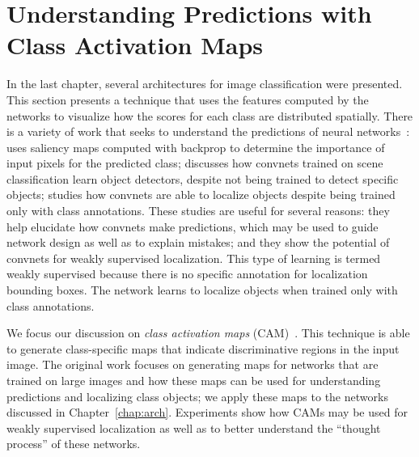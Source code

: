 
\section{Understanding Predictions with Class Activation Maps}
In the last chapter, several architectures for image classification were presented. This section presents a technique that uses the features computed by the networks to visualize how the scores for each class are distributed spatially. There is a variety of work that seeks to understand the predictions of neural networks~\cite{simonyan2014deep,zhou2015object,oquab2015object,zhou2016learning,selvaraju2016gradcam}: \cite{simonyan2014deep} uses saliency maps computed with backprop to determine the importance of input pixels for the predicted class; \cite{zhou2015object} discusses how convnets trained on scene classification learn object detectors, despite not being trained to detect specific objects; \cite{oquab2015object} studies how convnets are able to localize objects despite being trained only with class annotations. These studies are useful for several reasons: they help elucidate how convnets make predictions, which may be used to guide network design as well as to explain mistakes; and they show the potential of convnets for weakly supervised localization. This type of learning is termed weakly supervised because there is no specific annotation for localization bounding boxes. The network learns to localize objects when trained only with class annotations.

We focus our discussion on \textit{class activation maps} (CAM)~\cite{zhou2016learning}. This technique is able to generate class-specific maps that indicate discriminative regions in the input image. The original work focuses on generating maps for networks that are trained on large images and how these maps can be used for understanding predictions and localizing class objects; we apply these maps to the networks discussed in Chapter~\ref{chap:arch}. Experiments show how CAMs may be used for weakly supervised localization as well as to better understand the ``thought process'' of these networks.


